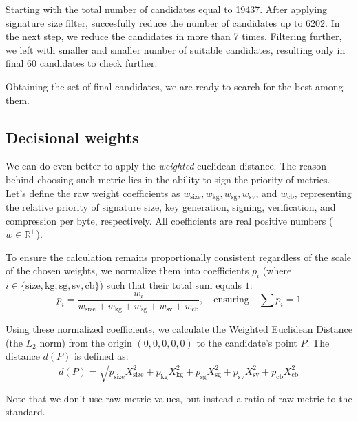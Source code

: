 Starting with the total number of candidates equal to 19437. After applying signature size filter, succesfully reduce the number of candidates up to 6202. In the next step, we reduce the candidates in more than 7 times. Filtering further, we left with smaller and smaller number of suitable candidates, resulting only in final 60 candidates to check further. 

Obtaining the set of final candidates, we are ready to search for the best among them. 


\subsection{Decisional weights}
We can do even better to apply the \emph{weighted} euclidean distance.  The reason behind choosing such metric lies in the ability to sign the priority of metrics. Let's define the raw weight coefficients as $w_{\text{size}}, w_{\text{kg}}, w_{\text{sg}}, w_{\text{sv}}$, and $w_{\text{cb}}$, representing the relative priority of signature size, key generation, signing, verification, and compression per byte, respectively. All coefficients are real positive numbers ($w \in \mathbb{R}^+$). 

To ensure the calculation remains proportionally consistent regardless of the scale of the chosen weights, we normalize them into coefficients $p_i$ (where $i \in \{\text{size}, \text{kg}, \text{sg}, \text{sv}, \text{cb}\}$) such that their total sum equals $1$:
\begin{equation}
    p_i = \frac{w_i}{w_{\text{size}} + w_{\text{kg}} + w_{\text{sg}} + w_{\text{sv}} + w_{\text{cb}}}, \quad \text{ensuring} \quad \sum p_i = 1
    \label{eq:weight_normalization}
\end{equation}

Using these normalized coefficients, we calculate the Weighted Euclidean Distance (the $L_2$ norm) from the origin $(0,0,0,0,0)$ to the candidate's point $P$. The distance $d(P)$ is defined as:
\begin{equation}
    d(P) = \sqrt{p_{\text{size}} X_{\text{size}}^2 + p_{\text{kg}} X_{\text{kg}}^2 + p_{\text{sg}} X_{\text{sg}}^2 + p_{\text{sv}} X_{\text{sv}}^2 + p_{\text{cb}} X_{\text{cb}}^2}
    \label{eq:weighted_euclidean_distance}
\end{equation}

Note that we don't use raw metric values, but instead a ratio of raw metric to the standard. 

